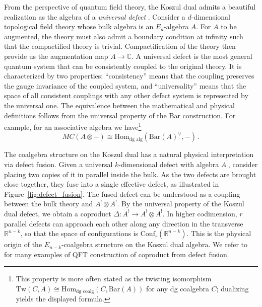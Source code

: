 \documentclass[11pt]{article}
\newcommand{\C}{\mathbb{C}}
\newcommand{\R}{\mathbb{R}}
\numberwithin{equation}{section}
\begin{document}
From the perspective of quantum field theory, the Koszul dual admits a beautiful realization as the algebra of a \emph{universal defect} \cite{Costello:2017dso,costello2023boundary}. Consider a $d$-dimensional topological field theory whose bulk algebra is an $E_d$-algebra $A$. For $A$ to be augmented, the theory must also admit a boundary condition at infinity such that the compactified theory is trivial. Compactification of the theory then provide us the augmentation map $A \to \C$. A universal defect is the most general quantum system that can be consistently coupled to the original theory. It is characterized by two properties: ``consistency'' means that the coupling preserves the gauge invariance of the coupled system, and ``universality'' means that the space of all consistent couplings with any other defect system is represented by the universal one. The equivalence between the mathematical and physical definitions follows from the universal property of the Bar construction. For example, for an associative algebra we have\footnote{This property is more often stated as the twisting isomorphism $\mathrm{Tw}(C,A) \cong \mathrm{Hom}_{\text{dg coalg}}(C,\mathrm{Bar}(A))$ for any dg coalgebra $C$; dualizing yields the displayed formula.}
\begin{equation}
	MC(A\otimes -) \cong \mathrm{Hom}_{\text{dg alg}}(\mathrm{Bar}(A)^{\vee}, - )\,.
\end{equation}

The coalgebra structure on the Koszul dual has a natural physical interpretation via defect fusion. Given a universal $k$-dimensional defect with algebra $A^!$, consider placing two copies of it in parallel inside the bulk. As the two defects are brought close together, they fuse into a single effective defect, as illustrated in Figure~\ref{fig:defect_fusion}. The fused defect can be understood as a coupling between the bulk theory and $A^!\otimes A^{!}$. By the universal property of the Koszul dual defect, we obtain a coproduct $\Delta\colon A^{!} \to A^{!}\otimes A^{!}$. In higher codimension, $r$ parallel defects can approach each other along any direction in the transverse $\R^{n-k}$, so that the space of configurations is $\mathrm{Conf}_r(\R^{n-k})$. This is the physical origin of the $E_{n-k}$-coalgebra structure on the Koszul dual algebra. We refer to \cite{Gaiotto:2020dsq,Oh:2021wes,Ishtiaque:2024orn} for many examples of QFT construction of coproduct from defect fusion.
\end{document}
